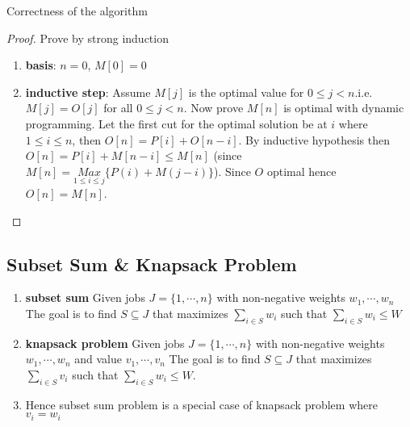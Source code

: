 \documentclass[11pt]{article}
\begin{document}
\begin{proposition*}
  Correctness of the algorithm
\end{proposition*}
\begin{proof}
  Prove by strong induction
  \begin{enumerate}
    \item \textbf{basis}: $n=0$, $M[0] = 0$
    \item \textbf{inductive step}: Assume $M[j]$ is the optimal value for $0 \leq j < n$.i.e. $M[j] = O[j]$ for all $0 \leq j < n$. Now prove $M[n]$ is optimal with dynamic programming. Let the first cut for the optimal solution be at $i$ where $1\leq i \leq n$, then $O[n] = P[i] + O[n-i]$. By inductive hypothesis then $O[n] = P[i] + M[n-i] \leq M[n]$ (since $M[n] =\underset{1 \leq i \leq j}{Max} \{ P(i) + M(j-i)\}$). Since $O$ optimal hence $O[n] = M[n]$.
  \end{enumerate}
\end{proof}

\subsection*{Subset Sum \& Knapsack Problem}


\begin{enumerate}
  \item \textbf{subset sum} Given jobs $J = \{1, \cdots, n\}$ with non-negative weights $w_1, \cdots, w_n$ The goal is to find $S\subseteq J$ that maximizes $\sum_{i\in S} w_i$ such that $\sum_{i\in S}w_i \leq W$
  \item \textbf{knapsack problem} Given jobs $J = \{1, \cdots, n\}$ with non-negative weights $w_1, \cdots, w_n$ and value $v_1,\cdots, v_n$ The goal is to find $S\subseteq J$ that maximizes $\sum_{i\in S} v_i$ such that $\sum_{i\in S}w_i \leq W$. \\
  \item Hence subset sum problem is a special case of knapsack problem where $v_i = w_i$
\end{enumerate}
\end{document}
